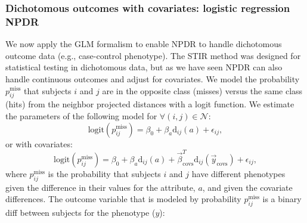 \documentclass[10pt]{article}
\begin{document}
\subsubsection{Dichotomous outcomes with covariates: logistic regression NPDR}
We now apply the GLM formalism to enable NPDR to handle dichotomous outcome data (e.g., case-control phenotype). The STIR method was designed for statistical testing in dichotomous data, but as we have seen NPDR can also handle continuous outcomes and adjust for covariates.
We model the probability $p^{\text{miss}}_{ij}$ that subjects $i$ and $j$ are in the opposite class (misses) versus the same class (hits) from the neighbor projected distances with a logit function. We estimate the parameters of the following model for $\forall(i,j) \in \mathcal{N}$:   
\begin{equation}\label{eq:logit_nocovar}
\text{logit}(p^{\text{miss}}_{ij}) = \beta_0 + \beta_a \text{d}_{ij}(a) + \epsilon_{ij},   
\end{equation}
or with covariates:
\begin{equation}\label{eq:too_logit}
\text{logit}(p^{\text{miss}}_{ij}) = \beta_0 + \beta_a \text{d}_{ij}(a) + \vec{\beta}^{T}_{\text{covs}} \text{d}_{ij}(\vec{y}_{\text{covs}}) + \epsilon_{ij},   
\end{equation}
where $p^{\text{miss}}_{ij}$ is the probability that subjects $i$ and $j$ have different phenotypes given the difference in their values for the attribute, $a$, and given the covariate differences.
The outcome variable that is modeled by probability $p^{\text{miss}}_{ij}$ is a binary diff between subjects for the phenotype ($y$):
   
\end{document}
